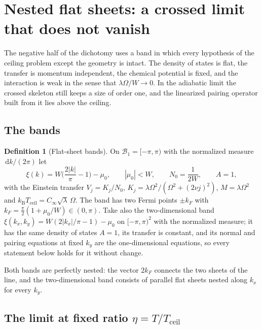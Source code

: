 \documentclass[11pt]{article}
\newcommand{\Cinf}{C_\infty}
\newcommand{\kB}{k_{\mathrm B}}
\newcommand{\Tceil}{T_{\mathrm{ceil}}}
\newcommand{\dd}{\,\mathrm d}
\theoremstyle{definition}
\newtheorem{definition}[theorem]{Definition}
\theoremstyle{remark}
\begin{document}
\section{Nested flat sheets: a crossed limit that does not vanish}\label{sec:flat}

The negative half of the dichotomy uses a band in which every hypothesis of the ceiling problem except the geometry is intact. The density of states is flat, the transfer is momentum independent, the chemical potential is fixed, and the interaction is weak in the sense that $\lambda\Omega/W\to0$. In the adiabatic limit the crossed skeleton still keeps a size of order one, and the linearized pairing operator built from it lies above the ceiling.

\subsection{The bands}

\begin{definition}[Flat-sheet bands]\label{def:flat}
On $\mathcal B_1=[-\pi,\pi)$ with the normalized measure $\dd k/(2\pi)$ let
\begin{equation}\label{eq:flatdisp}
\xi(k)=W\Big(\frac{2|k|}{\pi}-1\Big)-\mu_0,\qquad |\mu_0|<W,\qquad N_0=\frac{1}{2W},\qquad A=1,
\end{equation}
with the Einstein transfer $V_j=K_j/N_0$, $K_j=\lambda\Omega^2/(\Omega^2+(2\nu j)^2)$, $M=\lambda\Omega^2$ and $\kB\Tceil=\Cinf\sqrt\lambda\,\Omega$. The band has two Fermi points $\pm k_F$ with $k_F=\frac{\pi}{2}(1+\mu_0/W)\in(0,\pi)$. Take also the two-dimensional band $\xi(k_x,k_y)=W(2|k_x|/\pi-1)-\mu_0$ on $[-\pi,\pi)^2$ with the normalized measure; it has the same density of states $A=1$, its transfer is constant, and its normal and pairing equations at fixed $k_y$ are the one-dimensional equations, so every statement below holds for it without change.
\end{definition}

Both bands are perfectly nested: the vector $2k_F$ connects the two sheets of the line, and the two-dimensional band consists of parallel flat sheets nested along $k_x$ for every $k_y$.

\subsection{The limit at fixed ratio \texorpdfstring{$\eta=T/\Tceil$}{eta}}
\end{document}
